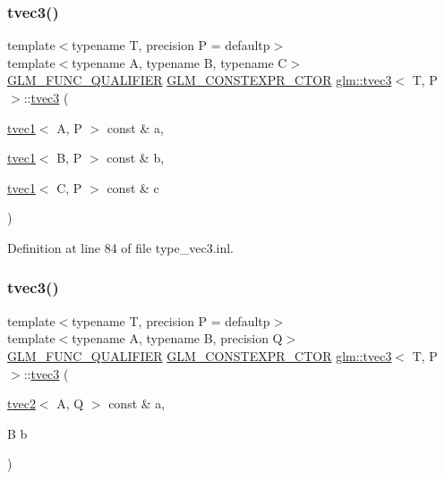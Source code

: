 \subsubsection{\texorpdfstring{tvec3()}{tvec3()}\hspace{0.1cm}{\footnotesize\ttfamily [17/23]}}
{\footnotesize\ttfamily template$<$typename T, precision P = defaultp$>$ \\
template$<$typename A, typename B, typename C$>$ \\
\mbox{\hyperlink{setup_8hpp_a33fdea6f91c5f834105f7415e2a64407}{G\+L\+M\+\_\+\+F\+U\+N\+C\+\_\+\+Q\+U\+A\+L\+I\+F\+I\+ER}} \mbox{\hyperlink{setup_8hpp_ad34178a09666081abdb573c14d1f4a5a}{G\+L\+M\+\_\+\+C\+O\+N\+S\+T\+E\+X\+P\+R\+\_\+\+C\+T\+OR}} \mbox{\hyperlink{structglm_1_1tvec3}{glm\+::tvec3}}$<$ T, P $>$\+::\mbox{\hyperlink{structglm_1_1tvec3}{tvec3}} (\begin{DoxyParamCaption}\item[{\mbox{\hyperlink{structglm_1_1tvec1}{tvec1}}$<$ A, P $>$ const \&}]{a,  }\item[{\mbox{\hyperlink{structglm_1_1tvec1}{tvec1}}$<$ B, P $>$ const \&}]{b,  }\item[{\mbox{\hyperlink{structglm_1_1tvec1}{tvec1}}$<$ C, P $>$ const \&}]{c }\end{DoxyParamCaption})}



Definition at line 84 of file type\+\_\+vec3.\+inl.

\mbox{\label{structglm_1_1tvec3_ae81af9e0d61ef8ed21994b9f824c4235}} 
\subsubsection{\texorpdfstring{tvec3()}{tvec3()}\hspace{0.1cm}{\footnotesize\ttfamily [18/23]}}
{\footnotesize\ttfamily template$<$typename T, precision P = defaultp$>$ \\
template$<$typename A, typename B, precision Q$>$ \\
\mbox{\hyperlink{setup_8hpp_a33fdea6f91c5f834105f7415e2a64407}{G\+L\+M\+\_\+\+F\+U\+N\+C\+\_\+\+Q\+U\+A\+L\+I\+F\+I\+ER}} \mbox{\hyperlink{setup_8hpp_ad34178a09666081abdb573c14d1f4a5a}{G\+L\+M\+\_\+\+C\+O\+N\+S\+T\+E\+X\+P\+R\+\_\+\+C\+T\+OR}} \mbox{\hyperlink{structglm_1_1tvec3}{glm\+::tvec3}}$<$ T, P $>$\+::\mbox{\hyperlink{structglm_1_1tvec3}{tvec3}} (\begin{DoxyParamCaption}\item[{\mbox{\hyperlink{structglm_1_1tvec2}{tvec2}}$<$ A, Q $>$ const \&}]{a,  }\item[{B}]{b }\end{DoxyParamCaption})}



